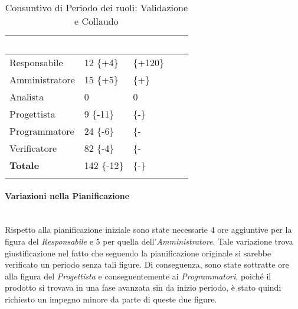\begin{longtable}{| C{.30\textwidth}| C{.15\textwidth}| C{.20\textwidth}|}
	\hline
	\textbf{\textcolor{white}{Ruolo}} & \textbf{\textcolor{white}{Ore}} & \textbf{\textcolor{white}{Costo in \euro}} \\
	\hline 
	Responsabile & 12 \{+4\} &  \{+120\} \\
	\hline
	Amministratore & 15 \{+5\} &   \{+\}\\
	\hline
	Analista & 0 & 0 \\
	\hline
	Progettista & 9 \{-11\} &   \{-\}\\
	\hline
	Programmatore & 24 \{-6\} &  \{- \\
	\hline 
	Verificatore & 82 \{-4\} &  \{-\\
	\hline
	\textbf{Totale} & 142 \{-12\} &  \{-\}\\
	\hline 
	
	\caption{Consuntivo di Periodo dei ruoli: Validazione e Collaudo}
	\label{Distribuzione ruoli pdc}
\end{longtable}

\paragraph{Variazioni nella Pianificazione}\label{variazione_ra} ~\\ 
Rispetto alla pianificazione iniziale sono state necessarie 4 ore aggiuntive per la figura del \textit{Responsabile} e 5 per quella dell'\textit{Amministratore}. Tale variazione trova giustificazione nel fatto che seguendo la pianificazione originale si sarebbe verificato un periodo senza tali figure. Di conseguenza, sono state sottratte ore alla figura del \textit{Progettista} e conseguentemente ai \textit{Programmatori}, poiché il prodotto si trovava in una fase avanzata sin da inizio periodo, è stato quindi richiesto un impegno minore da parte di queste due figure.

